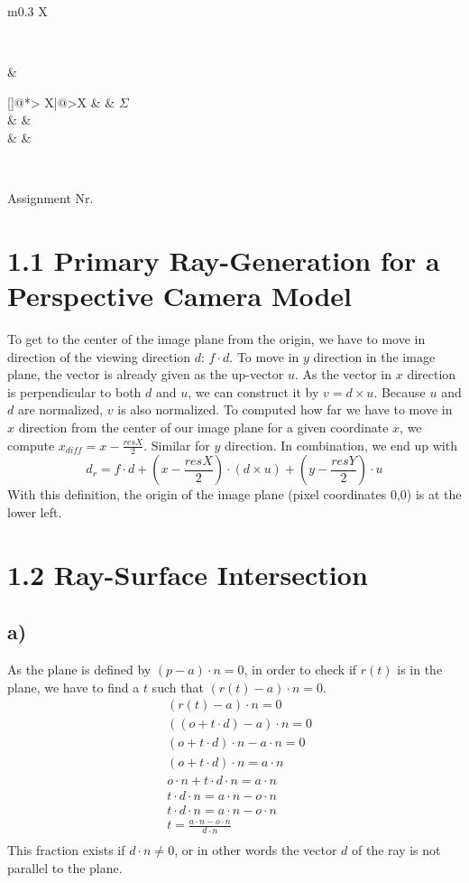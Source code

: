 \documentclass[a4paper]{scrartcl}
\makeatletter
\def\header#1#2{
  \begin{center}
    {\Large Assignment #1}\\
  \end{center}
}
\newcounter{punktelistectr}
\newcounter{punkte}
\newcommand{\punkteliste}[2]{%
  \setcounter{punkte}{#2}%
  \addtocounter{punkte}{-#1}%
  \stepcounter{punkte}%
  \begin{center}%
  \begin{tabularx}{\linewidth}[]{@{}*{\thepunkte}{>{\centering\arraybackslash} X|}@{}>{\centering\arraybackslash}X}
      \forloop{punktelistectr}{#1}{\value{punktelistectr} < #2 } %
      {%
        \thepunktelistectr &
      }
      #2 &  $\Sigma$ \\
      \hline
      \forloop{punktelistectr}{#1}{\value{punktelistectr} < #2 } %
      {%
        &
      } &\\
      \forloop{punktelistectr}{#1}{\value{punktelistectr} < #2 } %
      {%
        &
      } &\\
    \end{tabularx}
  \end{center}
}
\makeatother
\begin{document}
\begin{tabularx}{\linewidth}{m{0.3 \linewidth}X}
  \begin{minipage}{\linewidth}
    \STUDENTA\\
    \STUDENTB
  \end{minipage} & \begin{minipage}{\linewidth}
    \punkteliste{1}{\EXERCISES}
  \end{minipage}\\
\end{tabularx}
\header{Nr. \NUMBER}{\DEADLINE}


\section*{1.1 Primary Ray-Generation for a Perspective Camera Model}
To get to the center of the image plane from the origin, we have to move in
direction of the viewing direction $d$: $f\cdot d$. To move in $y$ direction
in the image plane, the vector is already given as the up-vector $u$. As the
vector in $x$ direction is perpendicular to both $d$ and $u$, we can construct
it by $v=d\times u$. Because $u$ and $d$ are normalized, $v$ is also normalized.
To computed how far we have to move in $x$ direction from the center of our
image plane for a given coordinate $x$, we compute $x_{diff}=x-\frac{resX}{2}$.
Similar for $y$ direction. In combination, we end up with
$$d_r = f \cdot d + (x - \frac{resX}{2}) \cdot (d \times u) + (y - \frac{resY}{2}) \cdot u$$
With this definition, the origin of the image plane (pixel coordinates 0,0) is at the lower left.

\section*{1.2 Ray-Surface Intersection}
    \subsection*{a)}
        As the plane is defined by $(p-a)\cdot n=0$, in order to check if $r(t)$
        is in the plane, we have to find a $t$ such that $(r(t)-a)\cdot n=0$.
        \begin{align*}
            &(r(t)-a)\cdot n=0\\
            &((o+t\cdot d)-a)\cdot n=0\\
            &(o+t\cdot d) \cdot n -a\cdot n=0\\
            &(o+t\cdot d) \cdot n =a\cdot n\\
            &o\cdot n+t\cdot d\cdot n =a\cdot n\\
            &t\cdot d\cdot n =a\cdot n-o\cdot n\\
            &t\cdot d\cdot n =a\cdot n-o\cdot n\\
            &t=\frac{a\cdot n-o\cdot n}{d\cdot n}\\
        \end{align*}
        This fraction exists if $d\cdot n \neq 0$, or in other words the vector
        $d$ of the ray is not parallel to the plane. 
\end{document}

